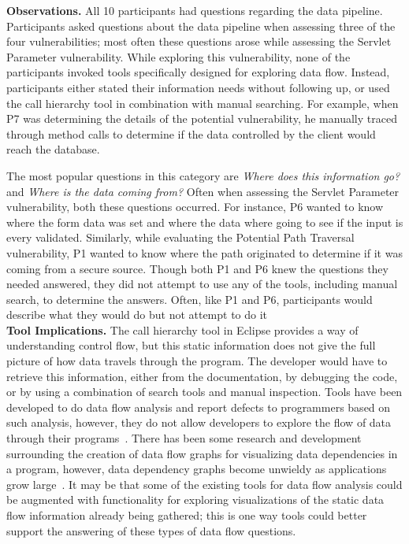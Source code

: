 \documentclass[conference]{IEEEtran}
\begin{document}
\noindent\textbf{Observations.}
All 10 participants had questions regarding the data pipeline.
Participants asked questions about the data pipeline when assessing three of the four vulnerabilities; most often these questions arose while assessing the Servlet Parameter vulnerability. 
While exploring this vulnerability, none of the participants invoked tools specifically designed for exploring data flow. 
Instead, participants either stated their information needs without following up, or used the call hierarchy tool in combination with manual searching.
For example, when P7 was determining the details of the potential vulnerability, he manually traced through method calls to determine if the data controlled by the client would reach the database.

The most popular questions in this category are \textit{Where does this information go?} and \textit{Where is the data coming from?} 
Often when assessing the Servlet Parameter vulnerability, both these questions occurred. 
For instance, P6 wanted to know where the form data was set and where the data where going to see if the input is every validated.  
Similarly, while evaluating the Potential Path Traversal vulnerability, P1 wanted to know where the path originated to determine if it was coming from a secure source.
Though both P1 and P6 knew the questions they needed answered, they did not attempt to use any of the tools, including manual search, to determine the answers. %
Often, like P1 and P6, participants would describe what they would do but not attempt to do it
\\

\noindent\textbf{Tool Implications.}
The call hierarchy tool in Eclipse provides a way of understanding control flow, but this static information does not give the full picture of how data travels through the program. 
The developer would have to retrieve this information, either from the documentation, by debugging the code, or by using a combination of search tools and manual inspection. 
Tools have been developed to do data flow analysis and report defects to programmers based on such analysis, however, they do not allow developers to explore the flow of data through their programs~\cite{jovanovic2006pixy}. 
There has been some research and development surrounding the creation of data flow graphs for visualizing data dependencies in a program, however, data dependency graphs become unwieldy as applications grow large~\cite{ghosh2001method, ferrante1987program}. 
It may be that some of the existing tools for data flow analysis could be augmented with functionality for exploring visualizations of the static data flow information already being gathered; this is one way tools could better support the answering of these types of data flow questions.
\end{document}
